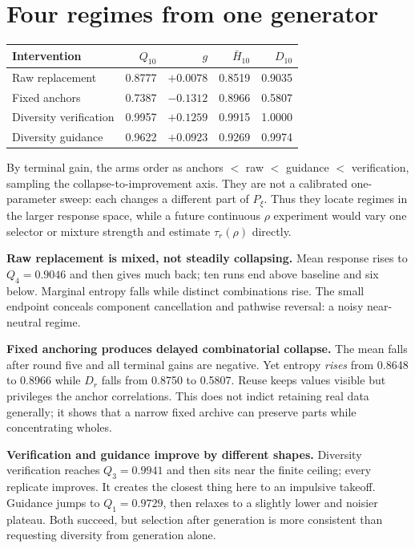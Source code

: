 \documentclass[10pt]{article}
\begin{document}
\section{Four regimes from one generator}

\begin{center}
\small
\begin{tabular}{lrrrr}
\hline
Intervention & $Q_{10}$ & $g$ & $\bar H_{10}$ & $D_{10}$\\
\hline
Raw replacement & 0.8777 & $+0.0078$ & 0.8519 & 0.9035\\
Fixed anchors & 0.7387 & $-0.1312$ & 0.8966 & 0.5807\\
Diversity verification & 0.9957 & $+0.1259$ & 0.9915 & 1.0000\\
Diversity guidance & 0.9622 & $+0.0923$ & 0.9269 & 0.9974\\
\hline
\end{tabular}
\end{center}

By terminal gain, the arms order as anchors $<$ raw $<$ guidance $<$ verification, sampling the collapse-to-improvement axis. They are not a calibrated one-parameter sweep: each changes a different part of $P_\xi$. Thus they locate regimes in the larger response space, while a future continuous $\rho$ experiment would vary one selector or mixture strength and estimate $\tau_r(\rho)$ directly.

\textbf{Raw replacement is mixed, not steadily collapsing.} Mean response rises to $Q_4=0.9046$ and then gives much back; ten runs end above baseline and six below. Marginal entropy falls while distinct combinations rise. The small endpoint conceals component cancellation and pathwise reversal: a noisy near-neutral regime.

\textbf{Fixed anchoring produces delayed combinatorial collapse.} The mean falls after round five and all terminal gains are negative. Yet entropy \emph{rises} from 0.8648 to 0.8966 while $D_r$ falls from 0.8750 to 0.5807. Reuse keeps values visible but privileges the anchor correlations. This does not indict retaining real data generally; it shows that a narrow fixed archive can preserve parts while concentrating wholes.

\textbf{Verification and guidance improve by different shapes.} Diversity verification reaches $Q_3=0.9941$ and then sits near the finite ceiling; every replicate improves. It creates the closest thing here to an impulsive takeoff. Guidance jumps to $Q_1=0.9729$, then relaxes to a slightly lower and noisier plateau. Both succeed, but selection after generation is more consistent than requesting diversity from generation alone.
\end{document}
